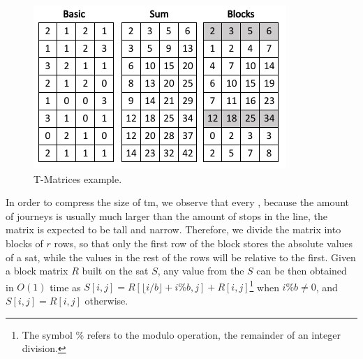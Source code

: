     \begin{figure}[ht]
    \begin{center}
      \includegraphics[scale=0.8]{figures/Tmatrices.png}
      \caption{T-Matrices example.}
      \label{fig:tmatrix}
    \end{center}
    \end{figure}
    
    
    
    In order to compress the size of \gls{tm}, we observe that every , because the amount of journeys is usually much larger than the amount of stops in the line, the matrix is expected to be tall and narrow. Therefore, we divide the matrix into blocks of $r$ rows, so that only the first row of the block stores the absolute values of a \gls{sat}, while the values in the rest of the rows will be relative to the first. Given a block matrix $R$ built on the \gls{sat} $S$, any value from the $S$ can be then obtained in $O(1)$ time as $S[i,j] = R[\lfloor i/b \rfloor + i\%b,j] + R[i,j]$\footnote{The symbol $\%$ refers to the modulo operation, the remainder of an integer division.} when $i\%b \neq 0$, and $S[i,j] = R[i,j]$ otherwise.

